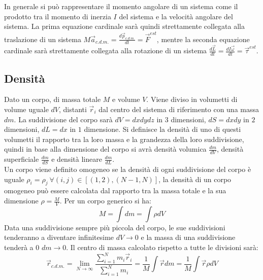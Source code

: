 \documentclass{article}
\numberwithin{equation}{subsection}
\begin{document}
In generale si può rappresentare il momento angolare di un sistema 
come il prodotto tra il momento di inerzia $I$ del sistema e la velocità angolare del sistema. 
La prima equazione cardinale sarà quindi strettamente collegata 
alla traslazione di un sistema $M\vec{a}_{c.d.m.}=\displaystyle\frac{d\vec{p}_{c.d.m.}}{dt}=\vec{F}^{est}$, 
mentre la seconda equazione cardinale sarà strettamente 
collegata alla rotazione di un sistema $\displaystyle\frac{d\vec{L}}{dt}=\frac{dI\vec{\omega}}{dt}=\vec{\tau}^{est}$. 

\subsection{Densità}
Dato un corpo, di massa totale $M$ e volume $V$. Viene diviso 
in volumetti di volume uguale $dV$, distanti $\vec{r}_i$ dal centro del sistema di 
riferimento con una massa $dm$. La suddivisione del corpo sarà 
$dV=dxdydz$ in $3$ dimensioni, $dS=dxdy$ in $2$ dimensioni, 
$dL=dx$ in $1$ dimensione. Si definisce la densità di uno 
di questi volumetti il rapporto tra la loro massa e la 
grandezza della loro suddivisione, quindi in base alla dimensione 
del corpo si avrà densità volumica $\displaystyle\frac{dm}{dV}$, 
densità superficiale $\displaystyle\frac{dm}{dS}$ e densità 
lineare $\displaystyle\frac{dm}{dL}$. \\
Un corpo viene definito omogeneo se la densità di ogni 
suddivisione del corpo è uguale $\rho_i=\rho_j\:\forall (i,j)\in[(1,2),(N-1,N)]$, 
la densità di un corpo omogeneo può essere calcolata dal rapporto 
tra la massa totale e la sua dimensione $\rho=\displaystyle\frac{M}{V}$. 
Per un corpo generico si ha: 
\begin{equation}
    M=\displaystyle\int dm=\int \rho dV 
\end{equation}
Data una suddivisione sempre più piccola del corpo, le sue 
suddivisioni tenderanno a diventare infinitesime $dV\to 0$ e 
la massa di una suddivisione tenderà a 0 $dm\to 0$. Il centro di 
massa calcolato rispetto a tutte le divisioni sarà: 
\begin{equation}
    \vec{r}_{c.d.m.}=\lim_{N\to\infty}\displaystyle\frac{\sum_{i=1}^{N}m_i\vec{r}_i}{\sum_{i=1}^{N}m_i}=\displaystyle\frac{1}{M}\int\vec{r}dm=\displaystyle\frac{1}{M}\int\vec{r}\rho dV
\end{equation}
\end{document}
